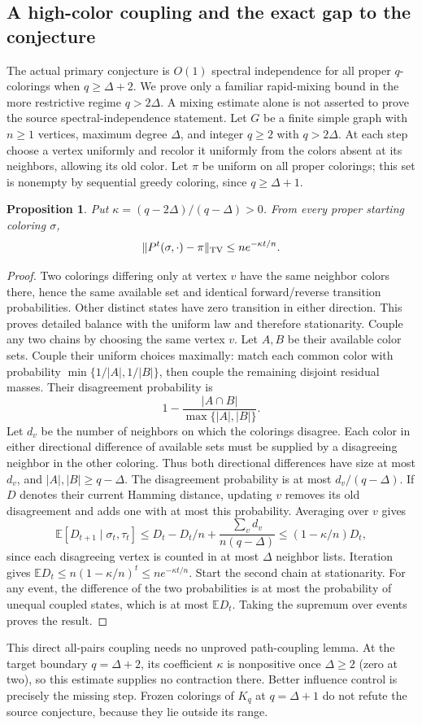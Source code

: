 \documentclass[11pt]{article}
\newtheorem{proposition}{Proposition}
\begin{document}
\subsection{A high-color coupling and the exact gap to the conjecture}
The actual primary conjecture is $O(1)$ spectral independence for all proper $q$-colorings when $q\ge\Delta+2$. We prove only a familiar rapid-mixing bound in the more restrictive regime $q>2\Delta$. A mixing estimate alone is not asserted to prove the source spectral-independence statement. Let $G$ be a finite simple graph with $n\ge1$ vertices, maximum degree $\Delta$, and integer $q\ge2$ with $q>2\Delta$.
At each step choose a vertex uniformly and recolor it uniformly from the colors absent at its neighbors, allowing its old color. Let $\pi$ be uniform on all proper colorings; this set is nonempty by sequential greedy coloring, since $q\ge\Delta+1$.
\begin{proposition}
Put $\kappa=(q-2\Delta)/(q-\Delta)>0$. From every proper starting coloring $\sigma$,
\[
\|P^t(\sigma,\cdot)-\pi\|_{\rm TV}\le n e^{-\kappa t/n}.
\]
\end{proposition}
\begin{proof}
Two colorings differing only at vertex $v$ have the same neighbor colors there, hence the same available set and identical forward/reverse transition probabilities. Other distinct states have zero transition in either direction. This proves detailed balance with the uniform law and therefore stationarity.
Couple any two chains by choosing the same vertex $v$. Let $A,B$ be their available color sets. Couple their uniform choices maximally: match each common color with probability $\min\{1/|A|,1/|B|\}$, then couple the remaining disjoint residual masses. Their disagreement probability is
\[
1-\frac{|A\cap B|}{\max\{|A|,|B|\}}.
\]
Let $d_v$ be the number of neighbors on which the colorings disagree. Each color in either directional difference of available sets must be supplied by a disagreeing neighbor in the other coloring. Thus both directional differences have size at most $d_v$, and $|A|,|B|\ge q-\Delta$. The disagreement probability is at most $d_v/(q-\Delta)$.
If $D$ denotes their current Hamming distance, updating $v$ removes its old disagreement and adds one with at most this probability. Averaging over $v$ gives
\[
\mathbb E[D_{t+1}\mid\sigma_t,\tau_t]
\le D_t-D_t/n+\frac{\sum_vd_v}{n(q-\Delta)}
\le(1-\kappa/n)D_t,
\]
since each disagreeing vertex is counted in at most $\Delta$ neighbor lists. Iteration gives $\mathbb ED_t\le n(1-\kappa/n)^t\le ne^{-\kappa t/n}$. Start the second chain at stationarity. For any event, the difference of the two probabilities is at most the probability of unequal coupled states, which is at most $\mathbb ED_t$. Taking the supremum over events proves the result.
\end{proof}
This direct all-pairs coupling needs no unproved path-coupling lemma. At the target boundary $q=\Delta+2$, its coefficient $\kappa$ is nonpositive once $\Delta\ge2$ (zero at two), so this estimate supplies no contraction there. Better influence control is precisely the missing step. Frozen colorings of $K_q$ at $q=\Delta+1$ do not refute the source conjecture, because they lie outside its range.
\end{document}
